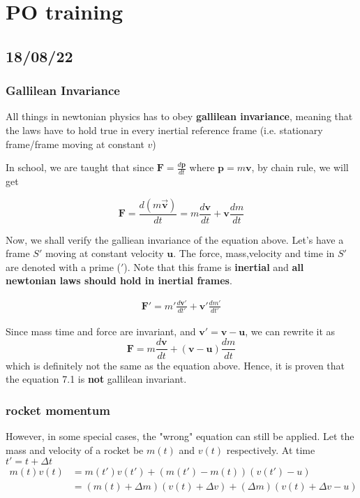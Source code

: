 \chapter{PO training}

\section{18/08/22}
\subsection{Gallilean Invariance}
All things in newtonian physics has to obey \textbf{gallilean invariance}, meaning that the laws have to hold true in every inertial reference frame (i.e. stationary frame/frame moving at constant $v$)

In school, we are taught that since $\mathbf{F}=\frac{d\mathbf{p}}{dt}$ where $\mathbf{p}=m \mathbf{v}$, by chain rule, we will get 

\begin{equation}
    \mathbf{F}=\frac{d (m\mathbf{\vec{v}})}{dt}=m\frac{d\mathbf{v}}{dt}+\mathbf{v} \frac{dm}{dt}
\end{equation}

Now, we shall verify the galliean invariance of the equation above. Let's have a frame $S'$ moving at constant velocity $\mathbf{u}$. The force, mass,velocity and time in $S'$ are denoted with a prime ($'$). Note that this frame is \textbf{inertial} and \textbf{all newtonian laws should hold in inertial frames}.

\begin{align}
    \mathbf{F}'=m'\frac{d\mathbf{v'}}{dt'}+\mathbf{v'} \frac{dm'}{dt'}
\end{align}

Since mass time and force are invariant, and $\mathbf{v'}=\mathbf{v}-\mathbf{u}$, we can rewrite it as 
\begin{equation}
    \mathbf{F}=m\frac{d\mathbf{v}}{dt}+(\mathbf{v}-\mathbf{u})\frac{dm}{dt}
\end{equation}
which is definitely not the same as the equation above. Hence, it is proven that the equation 7.1 is \textbf{not} gallilean invariant.

\subsection{rocket momentum}
However, in some special cases, the "wrong" equation can still be applied. 
Let the mass and velocity of a rocket be $m(t)$ and $v(t)$ respectively. 
At time $t'=t+\Delta t$
\begin{align}
    m(t)v(t) 
    &= m(t')v(t')+ (m(t')-m(t))(v(t')-u)\\
    &= (m(t)+\Delta m)(v(t)+\Delta v)+(\Delta m)(v(t)+\Delta v - u)
\end{align}

